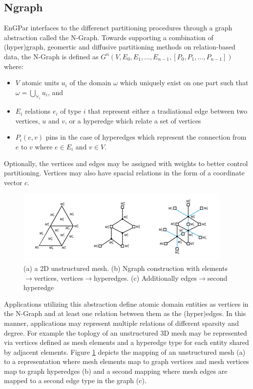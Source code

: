 \documentclass[a4paper]{article}
\begin{document}
\subsection{Ngraph}
EnGPar interfaces to the differenct partitioning procedures through a graph abstraction called the N-Graph. Towards supporting a combination of (hyper)graph, geomertic and diffusive partitioning methods on relation-based data, the N-Graph is defined as $G^n(V,E_0,E_1,...,E_{n-1},[P_0,P_1,...,P_{n-1}])$ where:
\begin{itemize}
  \item $V$ atomic units $u_i$ of the domain $\omega$ which uniquely exist on one
    part such that $\omega = \bigcup_{\forall_i}u_i$, and 
  \item $E_i$ relations $e_i$ of type $i$ that represent either a tradiational edge between two vertices, $u$ and $v$, or a hyperedge which relate a set of vertices
  \item $P_i(e,v)$ pins in the case of hyperedges which represent the connection
    from $e$ to $v$ where $e \in E_i$ and $v \in V$.
\end{itemize}
Optionally, the vertices and edges may be assigned with weights to better control partitioning. Vertices may also have spacial relations in the form of a coordinate vector $c$.

\begin{figure}[!ht]
  \centering
  \includegraphics[width=\textwidth]{exampleMesh2Graph.png}
  \caption{(a) a 2D unstructured mesh. (b) Ngraph construction with elements$\rightarrow$vertices, vertices$\rightarrow$hyperedges. (c) Additionally edges$\rightarrow$second hyperedge}
  \label{fig:Mesh2Graph}
\end{figure}

Applications utilizing this abstraction define atomic domain entities as vertices in the N-Graph and at least one relation between them as the (hyper)edges. In this manner, applications may represent multiple relations of different sparsity and degree. For example the toplogy of an unstructured 3D mesh may be represented via vertices defined as mesh elements and a hyperedge type for each entity shared by adjacent elements. Figure \ref{fig:Mesh2Graph} depicts the mapping of an unstructured mesh (a) to a representation where mesh elements map to graph vertices and mesh vertices map to graph hyperedges (b) and a second mapping where mesh edges are mapped to a second edge type in the graph (c).
\end{document}
